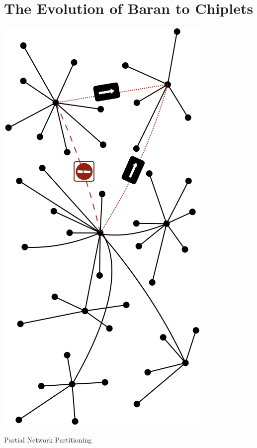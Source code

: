 
\section{The Evolution of Baran to Chiplets}

\begin{marginfigure}
  \includegraphics[width=0.6\linewidth]{../Figures/Baran-Decentralized-PNP.png}
  \caption{ Partial Network Partitioning}
\end{marginfigure}


